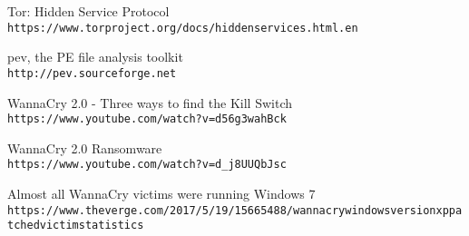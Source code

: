 \documentclass[10pt,a4paper]{article}
\begin{document}
\begin{thebibliography}{1}
Tor: Hidden Service Protocol
\\\texttt{https://www.torproject.org/docs/hidden\-services.html.en}

pev, the PE file analysis toolkit
\\\texttt{http://pev.sourceforge.net}

WannaCry 2.0 - Three ways to find the Kill Switch
\\\texttt{https://www.youtube.com/watch?v=d56g3wahBck}

WannaCry 2.0 Ransomware
\\\texttt{https://www.youtube.com/watch?v=d\_j8UUQbJsc}

Almost all WannaCry victims were running Windows 7
\\\texttt{https://www.theverge.com/2017/5/19/15665488/wannacry\-windows\-version\-xp\-patched\-victim\-statistics}

\end{thebibliography}
\end{document}
